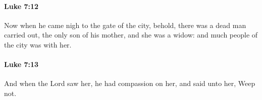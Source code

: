 		\paragraph{Luke 7:12} %
			\label{LUKE-7-12}

			Now when he came nigh to the gate of the city, behold, there was a dead man carried out, the only son of his mother, and she was a widow: and much people of the city was with her.

			\begin{framed}
			\scriptsize
				\begin{compactdesc}
					\item[SBLG] 
				\end{compactdesc}
			\end{framed}

		\paragraph{Luke 7:13} %
			\label{LUKE-7-13}

			And when the Lord saw her, he had compassion on her, and said unto her, Weep not.


